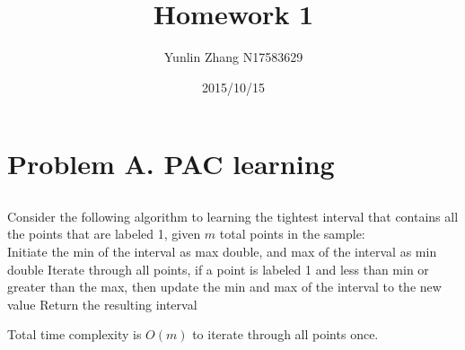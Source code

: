 \documentclass[11pt, oneside]{article}   	%
\title{Homework 1}
\author{Yunlin Zhang N17583629}
\date{2015/10/15}							%
\begin{document}
\maketitle
\section{Problem A. PAC learning}
\subsection{}
Consider the following algorithm to learning the tightest interval that contains all the points that are labeled 1, given $m$ total points in the sample:\\

\indent Initiate the min of the interval as max double, and max of the interval as min double
\indent Iterate through all points, if a point is labeled 1 and less than min or greater than the max, then update the min and max of the interval to the new value
\indent Return the resulting interval

Total time complexity is $O(m)$ to iterate through all points once. \\
\end{document}
